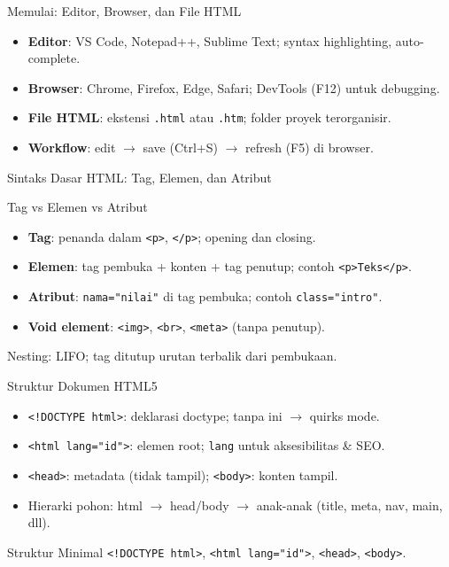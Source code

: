 \documentclass[handout]{beamer}
\begin{document}
\begin{frame}{Memulai: Editor, Browser, dan File HTML}
	\begin{itemize}
		\item \textbf{Editor}: VS Code, Notepad++, Sublime Text; syntax highlighting, auto-complete.
		\item \textbf{Browser}: Chrome, Firefox, Edge, Safari; DevTools (F12) untuk debugging.
		\item \textbf{File HTML}: ekstensi \texttt{.html} atau \texttt{.htm}; folder proyek terorganisir.
		\item \textbf{Workflow}: edit $\to$ save (Ctrl+S) $\to$ refresh (F5) di browser.
	\end{itemize}
\end{frame}

\begin{frame}{Sintaks Dasar HTML: Tag, Elemen, dan Atribut}
	\begin{block}{Tag vs Elemen vs Atribut}
		\begin{itemize}
			\item \textbf{Tag}: penanda dalam \texttt{<p>}, \texttt{</p>}; opening dan closing.
			\item \textbf{Elemen}: tag pembuka + konten + tag penutup; contoh \texttt{<p>Teks</p>}.
			\item \textbf{Atribut}: \texttt{nama="nilai"} di tag pembuka; contoh \texttt{class="intro"}.
			\item \textbf{Void element}: \texttt{<img>}, \texttt{<br>}, \texttt{<meta>} (tanpa penutup).
		\end{itemize}
	\end{block}
	Nesting: LIFO; tag ditutup urutan terbalik dari pembukaan.
\end{frame}

\begin{frame}{Struktur Dokumen HTML5}
	\begin{itemize}
		\item \texttt{<!DOCTYPE html>}: deklarasi doctype; tanpa ini $\to$ quirks mode.
		\item \texttt{<html lang="id">}: elemen root; \texttt{lang} untuk aksesibilitas \& SEO.
		\item \texttt{<head>}: metadata (tidak tampil); \texttt{<body>}: konten tampil.
		\item Hierarki pohon: html $\to$ head/body $\to$ anak-anak (title, meta, nav, main, dll).
	\end{itemize}
	\begin{block}{Struktur Minimal}
		\texttt{<!DOCTYPE html>}, \texttt{<html lang="id">}, \texttt{<head>}, \texttt{<body>}.
	\end{block}
\end{frame}
\end{document}
